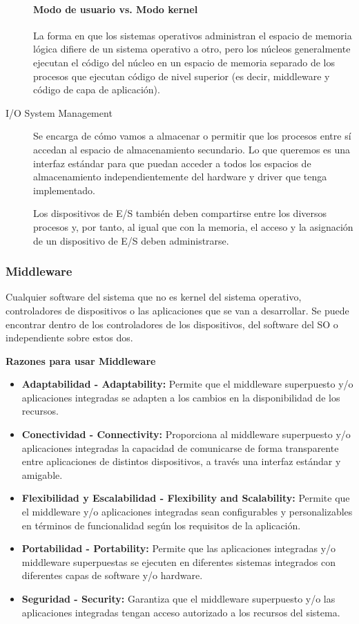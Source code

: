 \documentclass[12pt, twoside, openright]{report} %
\begin{document}
\begin{description}
	\paragraph{Modo de usuario vs. Modo kernel}
	La forma en que los sistemas operativos administran el espacio de memoria lógica difiere de un sistema operativo a otro, pero los núcleos generalmente ejecutan el código del núcleo en un espacio de memoria separado de los procesos que ejecutan código de nivel superior (es decir, middleware y código de capa de aplicación).


	\item[I/O System Management] Se encarga de cómo vamos a almacenar o permitir que los procesos entre sí accedan al espacio de almacenamiento secundario. Lo que queremos es una interfaz estándar para que puedan acceder a todos los espacios de almacenamiento independientemente del hardware y driver que tenga implementado.

	Los dispositivos de E/S también deben compartirse entre los diversos procesos y, por tanto, al igual que con la memoria, el acceso y la asignación de un dispositivo de E/S deben administrarse.

\end{description}

\subsubsection{Middleware}

Cualquier software del sistema que no es kernel del sistema operativo, controladores de dispositivos o las aplicaciones que se van a desarrollar. Se puede encontrar dentro de los controladores de los dispositivos, del software del SO o independiente sobre estos dos.

\textbf{Razones para usar Middleware}
\begin{itemize}
	\item \textbf{Adaptabilidad - Adaptability:} Permite que el middleware superpuesto y/o aplicaciones integradas se adapten a los cambios en la disponibilidad de los recursos.
	\item \textbf{Conectividad - Connectivity:} Proporciona al middleware superpuesto y/o aplicaciones integradas la capacidad de comunicarse de forma transparente entre aplicaciones de distintos dispositivos, a través una interfaz estándar y amigable.
	\item \textbf{Flexibilidad y Escalabilidad - Flexibility and Scalability:} Permite que el middleware y/o aplicaciones integradas sean configurables y personalizables en términos de funcionalidad según los requisitos de la aplicación.
	\item \textbf{Portabilidad - Portability:} Permite que las aplicaciones integradas y/o middleware superpuestas se ejecuten en diferentes sistemas integrados con diferentes capas de software y/o hardware.
	\item \textbf{Seguridad - Security:} Garantiza que el middleware superpuesto y/o las aplicaciones integradas tengan acceso autorizado a los recursos del sistema.
\end{itemize}
\pagebreak
\end{document}
